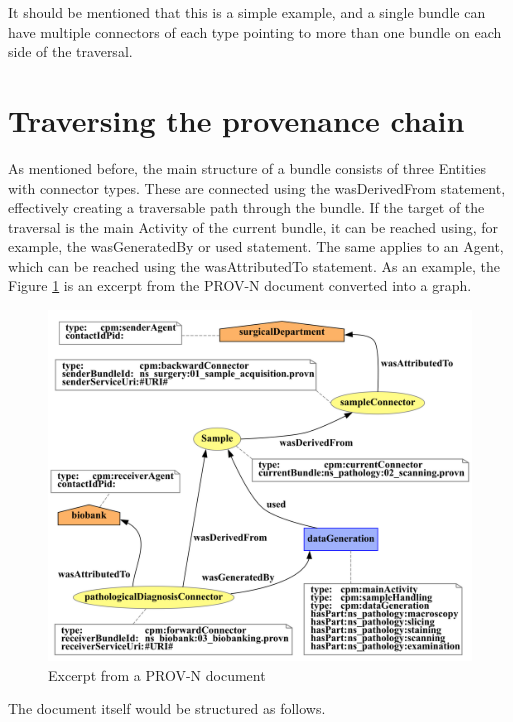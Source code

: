 \documentclass[
  digital,     %
  oneside,     %
  nosansbold,  %
  nocolorbold, %
  lof,         %
  lot,         %
]{fithesis4}
\begin{document}
 It should be mentioned that this is a simple example, and a single bundle can have multiple connectors of each type pointing to more than one bundle on each side of the traversal.
\shorthandon{-}

\section{Traversing the provenance chain}
\shorthandoff{-}
As mentioned before, the main structure of a bundle consists of three Entities with connector types. These are connected using the wasDerivedFrom statement, effectively creating a traversable path through the bundle. If the target of the traversal is the main Activity of the current bundle, it can be reached using, for example, the wasGeneratedBy or used statement. The same applies to an Agent, which can be reached using the wasAttributedTo statement. As an example, the Figure \ref{fig:bundleexample} is an excerpt from the PROV-N document converted into a graph.

\begin{figure}[htbp]
  \begin{center}
    \includegraphics[width=12.7cm]{fithesis/images/examplebigger.png}
  \end{center}
  \caption{Excerpt from a PROV-N document}
  \label{fig:bundleexample}
\end{figure}

The document itself would be structured as follows.
\end{document}

